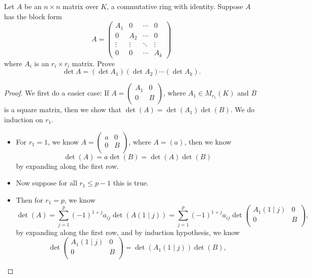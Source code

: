 \begin{problem}
Let $A$ be an $n \times n$ matrix over $K$, a commutative ring with identity. Suppose $A$ has the block form
$$
A = 
\begin{pmatrix}
A_1 & 0 & \cdots & 0 \\
0 & A_2 & \cdots & 0 \\
\vdots & \vdots & \ddots & \vdots \\
0 & 0 & \cdots & A_k
\end{pmatrix}
$$
where $A_i$ is an $r_i \times r_i$ matrix. Prove
$$
\det A = (\det A_1)(\det A_2) \cdots (\det A_k).
$$
\end{problem}
\begin{proof}
    We first do a easier case: If \(A = \begin{pmatrix}
        A_1 & 0  \\
        0 & B  \\
    \end{pmatrix}\), where \(A_1 \in M_{r_1}(K)\) and \(B\) is a square matrix, then we show that \(\det (A) = \det (A_1) \det (B)\). We do induction on \(r_1\). 
    \begin{itemize}
        \item For \(r_1 = 1\), we know \(A = \begin{pmatrix}
            a & 0  \\
            0 & B  \\
        \end{pmatrix}\), where \(A = (a)\), then we know
        \[
            \det (A) = a \det (B) = \det (A) \det (B)
        \]  by expanding along the first row. 
        \item Now suppose for all \(r_1 \le p - 1\) this is true. 
        \item Then for \(r_1 = p\), we know 
        \[
            \det (A) = \sum_{j=1}^p (-1)^{1+j} a_{ij} \det \left( A(1 \mid j) \right) = \sum_{j=1}^p (-1)^{1+j} a_{ij} \det \begin{pmatrix}
                A_1(1 \mid j) & 0  \\
                0 & B  \\
            \end{pmatrix},
        \] by expanding along the first row, and by induction hypothesis, we know 
        \[
            \det \begin{pmatrix}
                A_1(1 \mid j) & 0  \\
                0 & B  \\
            \end{pmatrix} = \det \left( A_1(1 \mid j) \right) \det (B),  
\]
\end{itemize}
\end{proof}
